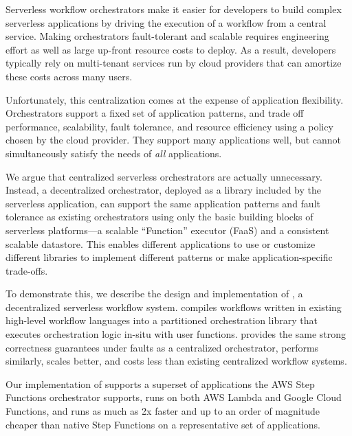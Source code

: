 Serverless workflow orchestrators make it easier for developers to build complex
serverless applications by driving the execution of a workflow from a central
service.  Making orchestrators fault-tolerant and scalable requires engineering
effort as well as large up-front resource costs to deploy. As a result,
developers typically rely on multi-tenant services run by cloud providers that
can amortize these costs across many users.

Unfortunately, this centralization comes at the expense of application
flexibility. Orchestrators support a fixed set of application patterns, and
trade off performance, scalability, fault tolerance, and resource efficiency
using a policy chosen by the cloud provider. They support many applications
well, but cannot simultaneously satisfy the needs of \emph{all} applications.

We argue that centralized serverless orchestrators are actually unnecessary.
Instead, a decentralized orchestrator, deployed as a library included by the
serverless application, can support the same application patterns and fault
tolerance as existing orchestrators using only the basic building blocks of
serverless platforms---a scalable ``Function'' executor (FaaS) and a consistent
scalable datastore. This enables different applications to use or customize
different libraries to implement different patterns or make application-specific
trade-offs.

To demonstrate this, we describe the design and implementation of \name{}, a
decentralized serverless workflow system. \name{} compiles workflows written in
existing high-level workflow languages into a partitioned orchestration library that
executes orchestration logic in-situ with user functions. \name{} provides the same
strong correctness guarantees under faults as a centralized orchestrator, performs
similarly, scales better, and costs less than existing centralized workflow
systems.

Our implementation of \name{} supports a superset of applications the AWS Step
Functions orchestrator supports, runs on both AWS Lambda and Google Cloud
Functions, and runs as much as 2x faster and up to an order of magnitude cheaper
than native Step Functions on a representative set of applications.
